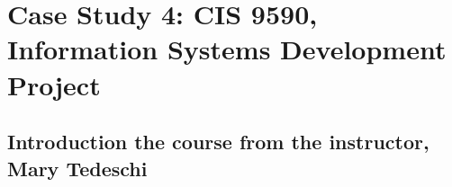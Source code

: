 \documentclass[acmlarge,timestamp]{acmart}
\begin{document}



\section{Case Study 4: CIS 9590, Information Systems Development Project} \label{cis-case-study}

\subsection{Introduction the course from the instructor, Mary Tedeschi}

\end{document}
